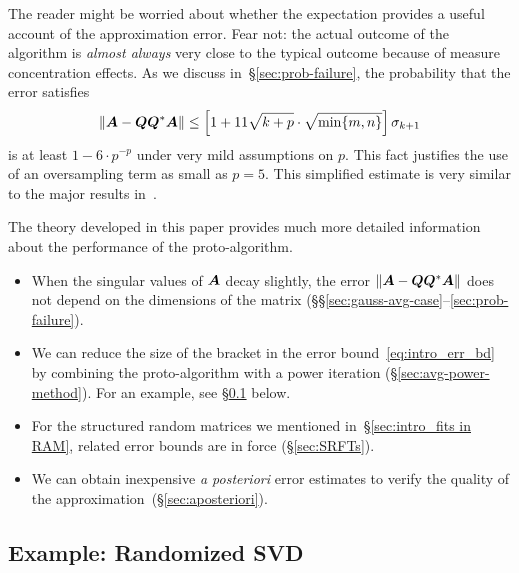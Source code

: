 \documentclass[final]{siamltex}
\newcounter{algorithm}[section]
\begin{document}
The reader might be worried about whether the expectation provides a
useful account of the approximation error.  Fear not: the actual outcome
of the algorithm is {\em almost always} very close to
the typical outcome because of measure
concentration effects.  As we discuss in~\S\ref{sec:prob-failure},
the probability that the error satisfies
\begin{equation} \label{eq:intro_err_prob}
\norm{ \mtx{A} - \mtx{QQ}^\adj \mtx{A} }
    \leq \left[ 1 + 11 \sqrt{k+p} \cdot\sqrt{\min\{m,n\}} \right] \sigma_{k+1}
\end{equation}
is at least $1 - 6 \cdot p^{-p}$ under very mild assumptions on $p$.
This fact justifies the use of an oversampling term as small as $p = 5$.
This simplified estimate is very similar to the major results in~\cite{random1}.

The theory developed in this paper provides much more detailed information about the
performance of the proto-algorithm.

\lsp

\begin{itemize}
\item
When the singular values of $\bm{A}$ decay slightly,
the error $\left\Vert { \bm{A} - \bm{QQ}^*\bm{A} } \right\Vert$
does not depend on the dimensions of the matrix
(\S\S\ref{sec:gauss-avg-case}--\ref{sec:prob-failure}).

\item   We can reduce the size of the bracket in the error bound~\eqref{eq:intro_err_bd}
by combining the proto-algorithm with a power iteration (\S\ref{sec:avg-power-method}).
For an example, see \S\ref{sec:pca} below.

\item   For the structured random matrices we mentioned in~\S\ref{sec:intro_fits in RAM},
related error bounds are in force (\S\ref{sec:SRFTs}).

\item   We can obtain inexpensive {\em a posteriori} error estimates to verify the quality
of the approximation~(\S\ref{sec:aposteriori}).

\end{itemize}

\subsection{Example: Randomized SVD}
\label{sec:pca}
\end{document}
